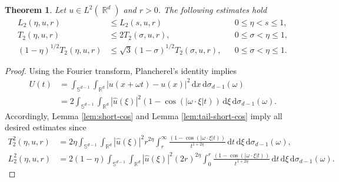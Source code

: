 \documentclass[12pt, reqno]{amsart}%
\theoremstyle{plain}  %
\newtheorem{theorem}{Theorem}[section]
\theoremstyle{definition}  %
\theoremstyle{remark}
\numberwithin{equation}{section}
\DeclareMathOperator{\R}{\mathbb{R}}
\renewcommand{\d}{\,\mathrm{d}}
\begin{document}
\begin{theorem}
\label{thm:r-split-monot-semin-l2}
Let $u\in L^2(\R^d)$ and $r>0$. The following estimates  hold
\begin{align*}
L_2(\eta, u,r)&\leq  L_2(s, u,r)&&0\leq  \eta<s\leq 1,\\
T_2(\eta, u,r)&\leq 2 T_2(\sigma , u,r), && 0\leq \sigma< \eta \leq 1,\\
(1-\eta)^{1/2}T_2(\eta, u,r)&\leq \sqrt{3} (1-\sigma)^{1/2}T_2(\sigma , u,r),
&& 0\leq \sigma< \eta \leq 1.
\end{align*}
\end{theorem}
\begin{proof}
Using the Fourier transform, Plancherel's identity implies
\begin{align*}
U(t)&= \int_{ \mathbb{S}^{d-1}} \int_{\R^d} | u(x+\omega t)-u(x)|^2\d x\d \sigma_{d-1}(\omega)\\
&= 2\int_{\mathbb{S}^{d-1}}  \int_{\R^d} |\widehat{u}(\xi)|^2(1-\cos (|\omega \cdot \xi| t))\d \xi\d \sigma_{d-1}(\omega).
\end{align*}
Accordingly,  Lemma \ref{lem:short-cos} and Lemma \ref{lem:tail-short-cos} imply all desired estimates since
\begin{align*}
T^2_2 (\eta, u,r) &=2 \eta \int_{\mathbb{S}^{d-1}}  \int_{\R^d}  |\widehat{u}(\xi)|^2 r^{2\eta}\int_r^\infty \frac{(1-\cos (|\omega\cdot \xi| t))}{t^{1+2\eta}}\d t \d \xi \d \sigma_{d-1}(\omega),\\
L^2_2 (\eta, u,r) &=2 (1-\eta )\int_{\mathbb{S}^{d-1}}  \int_{\R^d}  |\widehat{u}(\xi)|^2 (2r)^{2\eta}\int_0^r \frac{(1-\cos (|\omega\cdot \xi| t))}{t^{1+2\eta}}\d t \d \xi \d \sigma_{d-1}(\omega).
\end{align*}
\end{proof}
\end{document}
